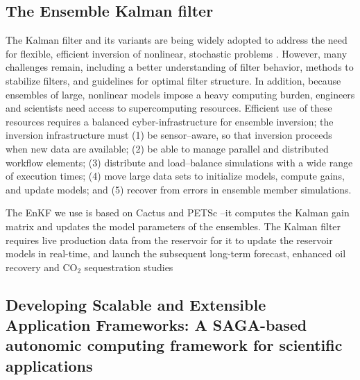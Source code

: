 \documentclass{acm_proc_article-sp}
\begin{document}
\subsection{The Ensemble Kalman filter} 

The Kalman filter and its variants are being widely adopted to address
the need for flexible, efficient inversion of nonlinear, stochastic
problems \cite{DataAssim}. However, many challenges remain,
including a better understanding of filter behavior, methods to
stabilize filters, and guidelines for optimal filter structure. In
addition, because ensembles of large, nonlinear models impose a heavy
computing burden, engineers and scientists need access to
supercomputing resources. Efficient use of these resources requires a
balanced cyber-infrastructure for ensemble inversion; the inversion
infrastructure must (1) be sensor--aware, so that inversion proceeds
when new data are available; (2) be able to manage parallel and
distributed workflow elements; (3) distribute and load--balance
simulations with a wide range of execution times; (4) move large data
sets to initialize models, compute gains, and update models; and (5)
recover from errors in ensemble member simulations.

The EnKF we use is based on Cactus and PETSc --it computes the Kalman
gain matrix and updates the model parameters of the ensembles. The
Kalman filter requires live production data from the reservoir for it
to update the reservoir models in real-time, and launch the subsequent
long-term forecast, enhanced oil recovery and CO$_2$ sequestration
studies

\subsection{Developing Scalable and Extensible Application
  Frameworks: A SAGA-based autonomic computing framework for
  scientific applications}
\end{document}
